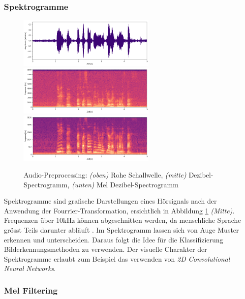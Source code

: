 \subsubsection{Spektrogramme} 
\begin{figure}[hbt]
	\centering
		\includegraphics[width=0.6\textwidth]{assets/audio_raw.png}
		\includegraphics[width=0.6\textwidth]{assets/audio_log.png}
		\includegraphics[width=0.6\textwidth]{assets/audio_mel.png}
	\centering
	\caption{Audio-Preprocessing: \textit{(oben)} Rohe Schallwelle, \textit{(mitte)}
		     Dezibel-Spectrogramm, 
		     \textit{(unten)} Mel Dezibel-Spectrogramm}
	\label{img:preprocessing}
\end{figure}
Spektrogramme sind grafische Darstellungen eines Hörsignals nach der Anwendung der Fourrier-Transformation\parencite[]['Spectrograms']{fourrier}, ersichtlich in Abbildung \ref{img:preprocessing} \textit{(Mitte)}. Frequenzen über 10kHz können abgeschnitten werden, da menschliche Sprache grösst Teils darunter abläuft \parencite{tenkHz}. Im Spektrogramm lassen sich von Auge Muster erkennen und unterscheiden. Daraus folgt die Idee für die Klassifizierung Bilderkennungsmethoden zu verwenden. Der visuelle Charakter der Spektrogramme erlaubt zum Beispiel das verwenden von \textit{2D Convolutional Neural Networks}.

\subsubsection{Mel Filtering} 

